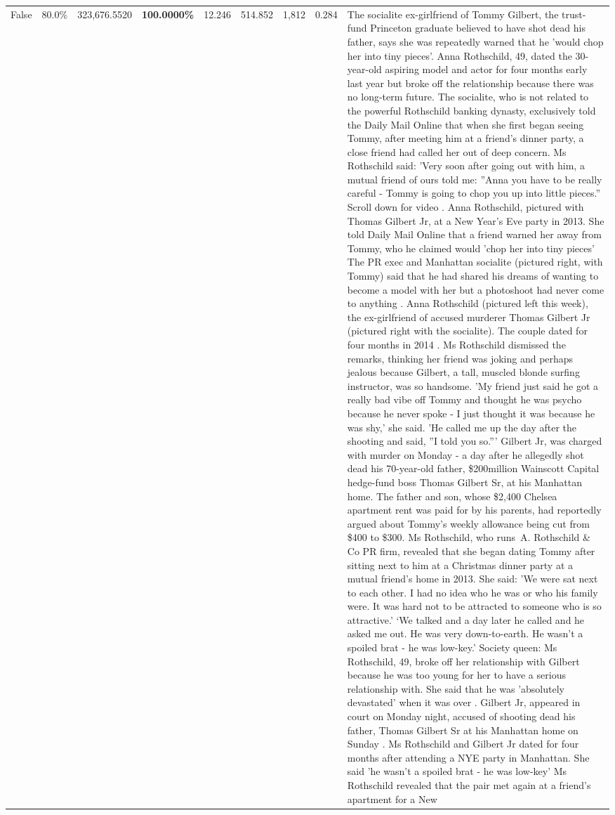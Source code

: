 \begin{table}[H]
\begin{tabular}{lllrlllll}
False & 80.0\% & 323,676.5520 & \bfseries \color{red} 100.0000\% & 12.246 & 514.852 & 1,812 & 0.284 & The socialite ex-girlfriend of Tommy Gilbert, the trust-fund Princeton graduate believed to have shot dead his father, says she was repeatedly warned that he 'would chop her into tiny pieces'. Anna Rothschild, 49, dated the 30-year-old aspiring model and actor for four months early last year but broke off the relationship because there was no long-term future. The socialite, who is not related to the powerful Rothschild banking dynasty, exclusively told the Daily Mail Online that when she first began seeing Tommy, after meeting him at a friend's dinner party, a close friend had called her out of deep concern. Ms Rothschild said: 'Very soon after going out with him, a mutual friend of ours told me: ''Anna you have to be really careful - Tommy is going to chop you up into little pieces.'' Scroll down for video . Anna Rothschild, pictured with Thomas Gilbert Jr, at a New Year's Eve party in 2013. She told Daily Mail Online that a friend warned her away from Tommy, who he claimed would 'chop her into tiny pieces' The PR exec and Manhattan socialite (pictured right, with Tommy) said that he had shared his dreams of wanting to become a model with her but a photoshoot had never come to anything . Anna Rothschild (pictured left this week), the ex-girlfriend of accused murderer Thomas Gilbert Jr (pictured right with the socialite). The couple dated for four months in 2014 . Ms Rothschild dismissed the remarks, thinking her friend was joking and perhaps jealous because Gilbert, a tall, muscled blonde surfing instructor, was so handsome. 'My friend just said he got a really bad vibe off Tommy and thought he was psycho because he never spoke - I just thought it was because he was shy,' she said. 'He called me up the day after the shooting and said, ''I told you so.''' Gilbert Jr, was charged with murder on Monday - a day after he allegedly shot dead his 70-year-old father, \$200million Wainscott Capital hedge-fund boss Thomas Gilbert Sr, at his Manhattan home. The father and son, whose \$2,400 Chelsea apartment rent was paid for by his parents, had reportedly argued about Tommy's weekly allowance being cut from \$400 to \$300. Ms Rothschild, who runs A. Rothschild \& Co PR firm, revealed that she began dating Tommy after sitting next to him at a Christmas dinner party at a mutual friend's home in 2013. She said: 'We were sat next to each other. I had no idea who he was or who his family were. It was hard not to be attracted to someone who is so attractive.' ‘We talked and a day later he called and he asked me out. He was very down-to-earth. He wasn’t a spoiled brat - he was low-key.’ Society queen: Ms Rothschild, 49, broke off her relationship with Gilbert because he was too young for her to have a serious relationship with. She said that he was 'absolutely devastated' when it was over . Gilbert Jr, appeared in court on Monday night, accused of shooting dead his father, Thomas Gilbert Sr at his Manhattan home on Sunday . Ms Rothschild and Gilbert Jr dated for four months after attending a NYE party in Manhattan. She said 'he wasn't a spoiled brat - he was low-key' Ms Rothschild revealed that the pair met again at a friend’s apartment for a New 
\end{tabular}
\end{table}
